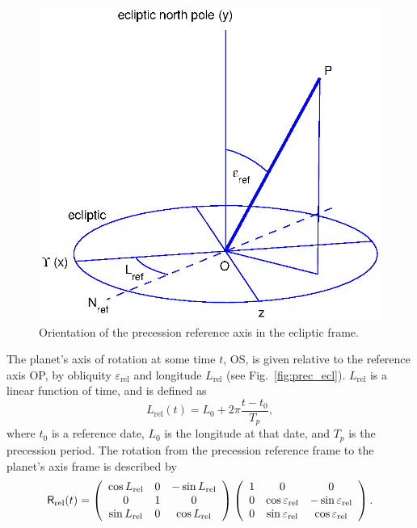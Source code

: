 \documentclass[Orbiter Technical Reference.tex]{subfiles}
\begin{document}
\begin{figure}[ht]
\includegraphics[width=\textwidth]{fig1.eps}
\caption{Orientation of the precession reference axis in the ecliptic frame.}
\label{fig:prec_ref}
\end{figure}
The planet's axis of rotation at some time $t$, OS, is given relative to the reference axis OP, by obliquity $\varepsilon_\mathrm{rel}$ and longitude $L_\mathrm{rel}$ (see Fig.~\ref{fig:prec_ecl}). $L_\mathrm{rel}$ is a linear function of time, and is defined as
\begin{equation}
L_\mathrm{rel}(t) = L_0 + 2\pi \frac{t-t_0}{T_p},
\end{equation}
where $t_0$ is a reference date, $L_0$ is the longitude at that date, and $T_p$ is the precession period.
The rotation from the precession reference frame to the planet's axis frame is described by
\begin{equation}
\mathsf{R}_\mathrm{rel}(t) = \left(\begin{array}{ccc}
\cos L_\mathrm{rel} & 0 & -\sin L_\mathrm{rel} \\
0 & 1 & 0 \\
\sin L_\mathrm{rel} & 0 & \cos L_\mathrm{rel}
\end{array} \right)
\left(\begin{array}{ccc}
1 & 0 & 0 \\
0 & \cos \varepsilon_\mathrm{rel} & -\sin \varepsilon_\mathrm{rel} \\
0 & \sin \varepsilon_\mathrm{rel} & \cos \varepsilon_\mathrm{rel}
\end{array} \right).
\end{equation}
\end{document}
